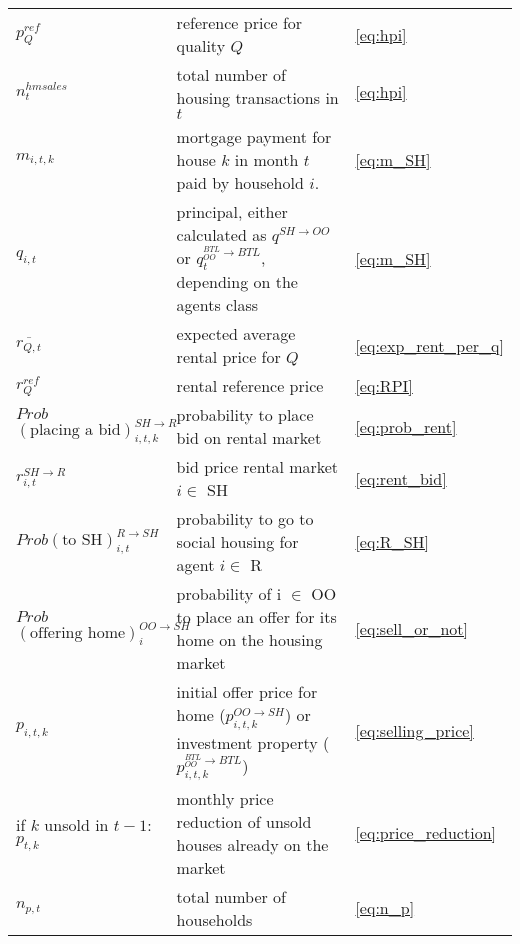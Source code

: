 \documentclass[]{article}
\begin{document}
\begin{longtable}{p{4cm} p{7cm}p{1cm}}
	$p^{ref}_{Q}$& reference price for quality $Q$&\eqref{eq:hpi}\\
	
	$n^{hm sales}_{t}$& total number of housing transactions in $t$&\eqref{eq:hpi}\\
	
	$m_{i,t,k}$&mortgage payment for house $k$ in month $t$ paid by household $i$.&\eqref{eq:m_SH}\\
	
	$q_{i,t}$& principal, either calculated as $q^{SH \rightarrow OO}$ \newline or $q^{^{BTL}_{OO} \rightarrow BTL}_{t}$, depending on the agents class &\eqref{eq:m_SH}\\
		
	$\overline{r_{Q, t}}$&expected average rental price for $Q$&\eqref{eq:exp_rent_per_q}\\
		
	$r^{ref}_{Q}$&rental reference price&\eqref{eq:RPI}\\
	
	$Prob$ $(\text{placing a bid})^{SH \rightarrow R}_{i,t,k}$&probability to place bid on rental market&\eqref{eq:prob_rent}\\
	
	$r^{SH \rightarrow R}_{i,t}$ &bid price rental market $i \in$ SH&\eqref{eq:rent_bid}\\
	
	$Prob(\text{to SH})^{R\rightarrow SH}_{i,t}$& probability to go to social housing for agent $i \in$ R&\eqref{eq:R_SH}\\
	
	$Prob$ $(\text{offering home})^{OO \rightarrow SH}_{i}$&probability of i $\in$ OO to place an offer for its home on the housing market&\eqref{eq:sell_or_not}\\
	
	$p_{i,t,k}$&initial offer price for home ($p^{OO \rightarrow SH}_{i,t,k}$) or investment property ($p^{^{BTL}_{OO} \rightarrow BTL}_{i,t,k}$)&\eqref{eq:selling_price}\\
	
	if $k$ unsold in $t-1$: \newline
	$p_{t, k}$&monthly price reduction of unsold houses already on the market&\eqref{eq:price_reduction}\\
	
	$n_{p, t}$& total number of households&\eqref{eq:n_p}\\
	
	

\end{longtable}
\end{document}
